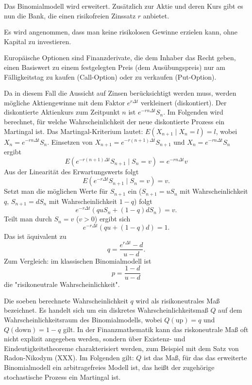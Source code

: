 Das Binomialmodell wird erweitert. Zusätzlich zur Aktie und deren Kurs gibt es nun die Bank, die einen risikofreien Zinssatz $r$ anbietet.

\begin{defi}
Es wird angenommen, dass man keine risikolosen Gewinne erzielen kann, ohne Kapital zu investieren.
\end{defi}

\begin{defi}
    Europäische Optionen sind Finanzderivate, die dem Inhaber das Recht geben, 
    einen Basiswert zu einem festgelegten Preis (dem Ausübungspreis) nur am 
    Fälligkeitstag zu kaufen (Call-Option) oder zu verkaufen (Put-Option).
\end{defi}


\begin{lemma}
Da in diesem Fall die Aussicht auf Zinsen berücksichtigt werden muss,
werden mögliche Aktiengewinne mit dem Faktor $e^{r \Delta t}$ verkleinert (diskontiert).
Der diskontierte Aktienkurs zum Zeitpunkt $n$ ist $e^{-r n \Delta t} S_n$.
Im Folgenden wird berechnet, für welche Wahrscheinlichkeit der neue diskontierte Prozess
ein Martingal ist. Das Martingal-Kriterium lautet: $E(X_{n+1} \mid X_n = l) = l$, wobei $X_n = e^{-r n \Delta t} S_n$.
Einsetzen von $X_{n+1} = e^{-r (n+1) \Delta t} S_{n+1}$ und $X_n = e^{-r n \Delta t} S_n$ ergibt
$$
E(e^{-r (n+1) \Delta t} S_{n+1} \mid S_n = v) = e^{-r n \Delta t} v
$$
Aus der Linearität des Erwartungswerts folgt
$$
E(e^{-r \Delta t} S_{n+1} \mid S_n=v) = v.
$$
Setzt man die möglichen Werte für $S_{n+1}$ ein ($S_{n+1} = u S_n$ mit Wahrscheinlichkeit $q$, $S_{n+1} = d S_n$ mit Wahrscheinlichkeit $1-q$) folgt
$$
e^{-r \Delta t} \left( q u S_n + (1-q) d S_n \right) = v.
$$
Teilt man durch $S_n = v$ ($v > 0$) ergibt sich
$$
e^{-r \Delta t} \left( q u + (1-q) d \right) = 1.
$$
Das ist äquivalent zu
$$
q = \frac{e^{r \Delta t} - d}{u - d}.
$$
Zum Vergleich: im klassischen Binomialmodell ist 
$$p = \frac{1 - d}{u - d}$$
die "risikoneutrale Wahrscheinlichkeit".
\end{lemma}

\begin{defi}
Die soeben berechnete Wahrscheinlichkeit $q$ wird als risikoneutrales Maß bezeichnet.
Es handelt sich um ein diskretes Wahrscheinlichkeitsmaß $Q$ auf dem Wahrscheinlichkeitsraum des Binomialmodells,
wobei $Q(\text{up})=q$ und $Q(\text{down})=1-q$ gilt. In der Finanzmathematik kann das
riskoneutrale Maß oft nicht explizit angegeben werden, sondern über Existenz- und Eindeutigkeitstheoreme
charakterisiert werden, zum Beispiel mit dem Satz von Radon-Nikodym (XXX). Im Folgenden gilt:
$Q$ ist das Maß, für das das erweiterte Binomialmodell ein arbitragefreies Modell ist, das 
heißt der zugehörige stochastische Prozess ein Martingal ist.
\end{defi}

